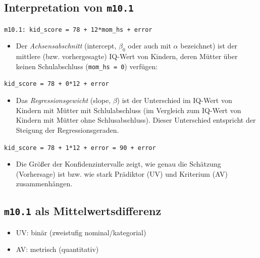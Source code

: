 \documentclass[
  a4paper,
  DIV=11]{scrreprt}
\providecommand{\tightlist}{%
  \setlength{\itemsep}{0pt}\setlength{\parskip}{0pt}}\usepackage{longtable,booktabs,array}
\theoremstyle{definition}
\theoremstyle{remark}
\begin{document}
\hypertarget{interpretation-von-m10.1}{%
\subsection{\texorpdfstring{Interpretation von
\texttt{m10.1}}{Interpretation von m10.1}}\label{interpretation-von-m10.1}}

\texttt{m10.1:\ kid\_score\ =\ 78\ +\ 12*mom\_hs\ +\ error}

\begin{itemize}
\tightlist
\item
  Der \emph{Achsensabschnitt} (intercept, \(\beta_0\) oder auch mit
  \(\alpha\) bezeichnet) ist der mittlere (bzw. vorhergesagte) IQ-Wert
  von Kindern, deren Mütter über keinen Schulabschluss
  (\texttt{mom\_hs\ =\ 0}) verfügen:
\end{itemize}

\texttt{kid\_score\ =\ 78\ +\ 0*12\ +\ error}

\begin{itemize}
\tightlist
\item
  Das \emph{Regressionsgewicht} (slope, \(\beta\)) ist der Unterschied
  im IQ-Wert von Kindern mit Mütter mit Schlulabschluss (im Vergleich
  zum IQ-Wert von Kindern mit Mütter ohne Schlusabschluss). Dieser
  Unterschied entspricht der Steigung der Regressionsgeraden.
\end{itemize}

\texttt{kid\_score\ =\ 78\ +\ 1*12\ +\ error\ =\ 90\ +\ error}

\begin{itemize}
\tightlist
\item
  Die Größer der Konfidenzintervalle zeigt, wie genau die Schätzung
  (Vorhersage) ist bzw. wie stark Prädiktor (UV) und Kriterium (AV)
  zusammenhängen.
\end{itemize}

\hypertarget{m10.1-als-mittelwertsdifferenz}{%
\subsection{\texorpdfstring{\texttt{m10.1} als
Mittelwertsdifferenz}{m10.1 als Mittelwertsdifferenz}}\label{m10.1-als-mittelwertsdifferenz}}

\begin{itemize}
\tightlist
\item
  UV: binär (zweistufig nominal/kategorial)
\item
  AV: metrisch (quantitativ)
\end{itemize}
\end{document}
